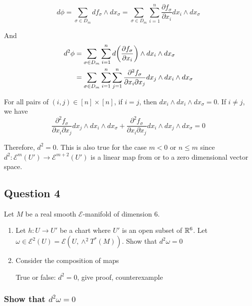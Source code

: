 \documentclass{article}
\begin{document}
$$
    d\phi = \sum_{\sigma \in D_m} d f_\sigma \wedge dx_\sigma = \sum_{\sigma \in D_m} \sum_{i=1}^n \frac{\partial f_\sigma}{\partial x_i} dx_i \wedge dx_\sigma
$$

And
\begin{align*}
    d^2 \phi 
    &= \sum_{\sigma \in D_m} \sum_{i=1}^n d \tuple*{\frac{\partial f_\sigma}{\partial x_i}} \wedge dx_i \wedge dx_\sigma \\
    &= \sum_{\sigma \in D_m} \sum_{i=1}^n \sum_{j=1}^n \frac{\partial^2 f_\sigma}{\partial x_i\partial x_j} dx_j \wedge dx_i \wedge dx_\sigma \\
\end{align*}

For all pairs of $(i, j) \in [n] \times [n]$, if $i = j$, then $dx_i \wedge dx_i \wedge dx_\sigma = 0$. If $i \neq j$, we have
$$
    \frac{\partial^2 f_\sigma}{\partial x_i\partial x_j} dx_j \wedge dx_i \wedge dx_\sigma + \frac{\partial^2 f_\sigma}{\partial x_i\partial x_j} dx_i \wedge dx_j \wedge dx_\sigma = 0
$$

Therefore, $d^2 = 0$. This is also true for the case $m < 0$ or $n \leq m$ since $d^2: \mathcal{E}^m(U')\to \mathcal{E}^{m+2}(U')$ is a linear map from or to a zero dimensional vector space.


\subsection{Question 4}

Let $M$ be a real smooth $\mathcal{E}$-manifold of dimension $6$.
\begin{enumerate}
    \item Let $h: U \to U'$ be a chart where $U'$ is an open subset of $\mathbb{R}^6$. Let $\omega \in \mathcal{E}^2(U) = \mathcal{E}(U, \wedge^2 T^*(M))$. Show that $d^2 \omega = 0$

    \item Consider the composition of maps
\begin{center}
\end{center}

    True or false: $d^2 = 0$, give proof, counterexample

\end{enumerate}

\subsubsection{Show that $d^2 \omega = 0$}
\end{document}
